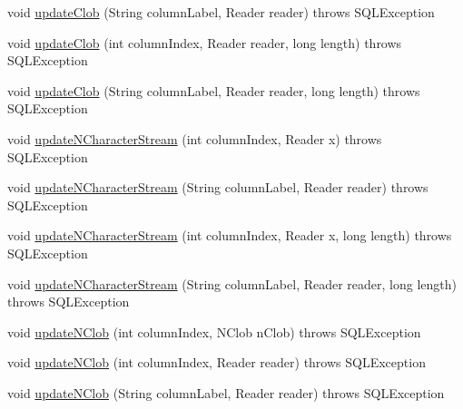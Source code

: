 \begin{DoxyCompactItemize}
\item 
void \mbox{\hyperlink{classcom_1_1mysql_1_1cj_1_1jdbc_1_1result_1_1_result_set_impl_a3a9dad109e9890dc6319856aeaeb2c69}{update\+Clob}} (String column\+Label, Reader reader)  throws S\+Q\+L\+Exception 
\item 
void \mbox{\hyperlink{classcom_1_1mysql_1_1cj_1_1jdbc_1_1result_1_1_result_set_impl_a45878d9a8985473017f7aa2d3f3968da}{update\+Clob}} (int column\+Index, Reader reader, long length)  throws S\+Q\+L\+Exception 
\item 
void \mbox{\hyperlink{classcom_1_1mysql_1_1cj_1_1jdbc_1_1result_1_1_result_set_impl_a0631c05fe5d73a7e6e1fb50147b6b895}{update\+Clob}} (String column\+Label, Reader reader, long length)  throws S\+Q\+L\+Exception 
\item 
void \mbox{\hyperlink{classcom_1_1mysql_1_1cj_1_1jdbc_1_1result_1_1_result_set_impl_a68aaf9c29c85884d74390584ea1ef955}{update\+N\+Character\+Stream}} (int column\+Index, Reader x)  throws S\+Q\+L\+Exception 
\item 
void \mbox{\hyperlink{classcom_1_1mysql_1_1cj_1_1jdbc_1_1result_1_1_result_set_impl_abc2e7f0e85ba26a0cfa6379b48203b99}{update\+N\+Character\+Stream}} (String column\+Label, Reader reader)  throws S\+Q\+L\+Exception 
\item 
void \mbox{\hyperlink{classcom_1_1mysql_1_1cj_1_1jdbc_1_1result_1_1_result_set_impl_a04995ba1542811386004b3e2c91cd25e}{update\+N\+Character\+Stream}} (int column\+Index, Reader x, long length)  throws S\+Q\+L\+Exception 
\item 
void \mbox{\hyperlink{classcom_1_1mysql_1_1cj_1_1jdbc_1_1result_1_1_result_set_impl_a53b0db21a9974df776ae363e0f1bc76e}{update\+N\+Character\+Stream}} (String column\+Label, Reader reader, long length)  throws S\+Q\+L\+Exception 
\item 
void \mbox{\hyperlink{classcom_1_1mysql_1_1cj_1_1jdbc_1_1result_1_1_result_set_impl_a9598931f50dfced2c727e393aa7a4997}{update\+N\+Clob}} (int column\+Index, N\+Clob n\+Clob)  throws S\+Q\+L\+Exception 
\item 
void \mbox{\hyperlink{classcom_1_1mysql_1_1cj_1_1jdbc_1_1result_1_1_result_set_impl_a62eb1f1e905bd763bed51c3b3a5d9186}{update\+N\+Clob}} (int column\+Index, Reader reader)  throws S\+Q\+L\+Exception 
\item 
void \mbox{\hyperlink{classcom_1_1mysql_1_1cj_1_1jdbc_1_1result_1_1_result_set_impl_a4db9298794d700d053d1fcb1cd75acf8}{update\+N\+Clob}} (String column\+Label, Reader reader)  throws S\+Q\+L\+Exception 
\item 

\end{DoxyCompactItemize}
